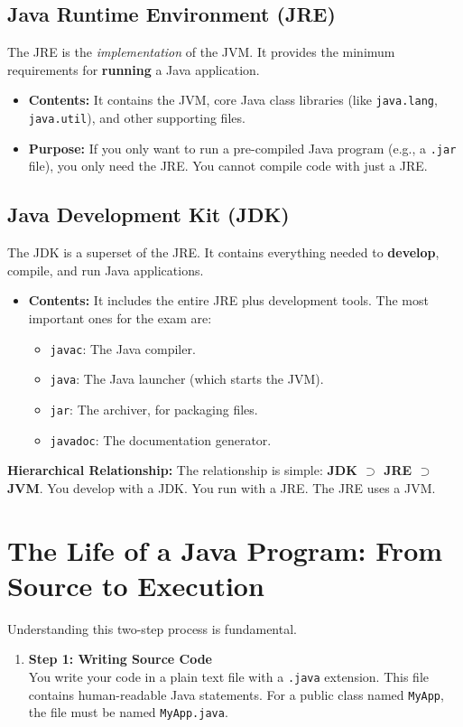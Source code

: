 \documentclass[12pt]{article}
\begin{document}
\begin{enumerate}[label=(\arabic*)]
\subsection{Java Runtime Environment (JRE)}
The JRE is the \textit{implementation} of the JVM. It provides the minimum requirements for \textbf{running} a Java application.
\begin{itemize}
    \item \textbf{Contents:} It contains the JVM, core Java class libraries (like \texttt{java.lang}, \texttt{java.util}), and other supporting files.
    \item \textbf{Purpose:} If you only want to run a pre-compiled Java program (e.g., a \texttt{.jar} file), you only need the JRE. You cannot compile code with just a JRE.
\end{itemize}

\subsection{Java Development Kit (JDK)}
The JDK is a superset of the JRE. It contains everything needed to \textbf{develop}, compile, and run Java applications.
\begin{itemize}
    \item \textbf{Contents:} It includes the entire JRE plus development tools. The most important ones for the exam are:
    \begin{itemize}
        \item \texttt{javac}: The Java compiler.
        \item \texttt{java}: The Java launcher (which starts the JVM).
        \item \texttt{jar}: The archiver, for packaging files.
        \item \texttt{javadoc}: The documentation generator.
    \end{itemize}
\end{itemize}

\textbf{Hierarchical Relationship:} The relationship is simple: \textbf{JDK $\supset$ JRE $\supset$ JVM}.
You develop with a JDK. You run with a JRE. The JRE uses a JVM.

\section{The Life of a Java Program: From Source to Execution}
Understanding this two-step process is fundamental.

\begin{enumerate}
    \item \textbf{Step 1: Writing Source Code} \\
    You write your code in a plain text file with a \texttt{.java} extension. This file contains human-readable Java statements. For a public class named \texttt{MyApp}, the file must be named \texttt{MyApp.java}.


\end{enumerate}
\end{enumerate}
\end{document}
